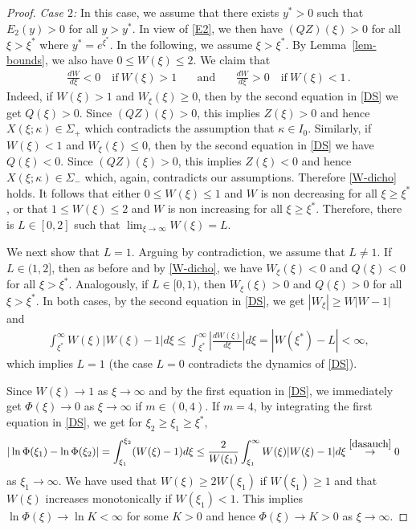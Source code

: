 \documentclass{article}%
\newcommand{\kap}{\kappa}
\begin{document}
\begin{proof}
{\it Case $2$: } In this case, we assume that there exists $y^* > 0$ such that $E_{2}(y) >0$
 for all $y>y^*$. In view of \eqref{E2}, we then have $(QZ)(\xi)>0$ for all $\xi > \xi^*$
 where $y^* = e^{\xi^*}$. In the following, we assume $\xi > \xi^*$. By Lemma~\ref{lem-bounds},
 we also have $0 \leq W(\xi) \leq 2$. We claim that
  \begin{align} \label{W-dicho} %
    \frac{dW}{d\xi} < 0 \quad \text{if} \ W(\xi) > 1 \ && \text{and} && %
    \ \frac{dW}{d\xi} > 0 \quad \text{if} \ W(\xi) < 1\,.
  \end{align}
Indeed, if $W(\xi) > 1$ and $W_\xi(\xi) \geq 0$, then by the second equation in 
\eqref{DS} we get $Q(\xi) >0$. Since $(QZ)(\xi) > 0$, this implies $Z(\xi) > 0$ and 
hence $X(\xi;\kap) \in \Sigma_+$ which contradicts the assumption that $\kap \in I_0$.
 Similarly, if $W(\xi) < 1$ and $W_\xi(\xi) \leq 0$, then by the second equation in \eqref{DS}
 we have $Q(\xi) < 0$. Since $(QZ)(\xi) > 0$, this implies $Z(\xi) < 0$ and hence 
$X(\xi;\kap) \in \Sigma_-$ which, again, contradicts our assumptions. 
Therefore \eqref{W-dicho} holds. It follows that either $0 \leq W(\xi) \leq 1$ 
and $W$ is non decreasing for all $\xi\geq \xi^*$, or that $1 \leq W(\xi) \leq 2$ 
and $W$ is non increasing for all $\xi\geq \xi^*$. Therefore, there is $L\in [0, 2]$ 
such that $\lim_{\xi\to \infty}W(\xi) = L$.

We next show that $L=1$. Arguing by contradiction, we assume that $L\neq1$. 
If $L \in (1,2]$, then as before and by \eqref{W-dicho}, we have $W_\xi(\xi) < 0$ 
and $Q(\xi) < 0$ for all $\xi > \xi^*$. Analogously, if $L \in [0,1)$, then 
$W_\xi(\xi) > 0$ and $Q(\xi) > 0$ for all $\xi > \xi^*$. In both cases, by the
 second equation in \eqref{DS}, we get $|W_\xi| \geq W |W-1|$ and
  \begin{align} \label{dasauch} %
    \int_{\xi^*}^\infty W(\xi) |W(\xi)-1| d\xi \leq 
\int_{\xi^*}^\infty \left| \frac{dW(\xi)}{d \xi}\right| d\xi = 
|W(\xi^*) - L| < \infty,
  \end{align}
which implies $L = 1$ (the case $L=0$ contradicts the dynamics of \eqref{DS}).

Since $W(\xi)\to 1$ as $\xi\to\infty$ and by the first equation in \eqref{DS}, 
we immediately get $\Phi(\xi) \to 0$ as $\xi \to \infty$ if $m \in (0,4)$. 
If $m=4$, by integrating the first equation in \eqref{DS}, we get for $\xi_2 \geq \xi_1 \geq \xi^*$,
\begin{align*}
  \hspace{6ex} & \hspace{-6ex} %
 |\ln \Phi(\xi_1) - \ln \Phi(\xi_2)| = \int_{\xi_1}^{\xi_2} (W(\xi) - 1)d\xi \leq 
\frac 2{W(\xi_1)} \int_{\xi_1}^\infty W(\xi) |W(\xi)-1| d\xi %
 \stackrel{\eqref{dasauch}}{\to}0
 \end{align*}
as $\xi_1 \to \infty$. We have used that $W(\xi) \geq 2W(\xi_1)$ if $W(\xi_1) \geq 1$ 
and that $W(\xi)$ increases monotonically if $W(\xi_1) < 1$. This implies 
$\ln \Phi(\xi) \to \ln K < \infty$ for some $K > 0$ and hence $\Phi(\xi) \to K > 0$ as $\xi\to\infty$.
\end{proof}
\end{document}
